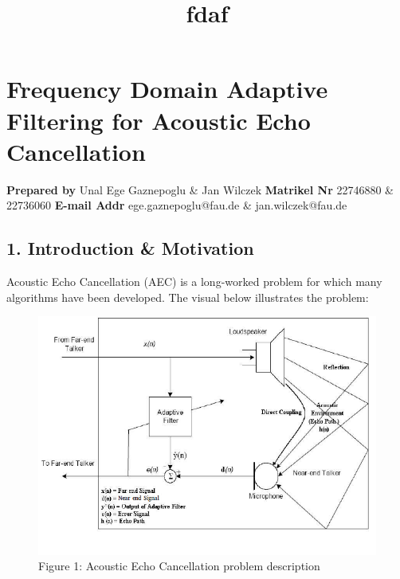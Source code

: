 \documentclass[11pt]{article}
\title{fdaf}
\begin{document}
    
    \maketitle
    
    

    
    \hypertarget{frequency-domain-adaptive-filtering-for-acoustic-echo-cancellation}{%
\section{Frequency Domain Adaptive Filtering for Acoustic Echo
Cancellation}\label{frequency-domain-adaptive-filtering-for-acoustic-echo-cancellation}}

\textbf{Prepared by} \textbar{} Unal Ege Gaznepoglu \& Jan Wilczek
\textbf{Matrikel Nr} \textbar{} 22746880 \& 22736060 \textbf{E-mail
Addr} \textbar{} ege.gaznepoglu@fau.de \& jan.wilczek@fau.de

    \hypertarget{introduction-motivation}{%
\subsection{1. Introduction \&
Motivation}\label{introduction-motivation}}

Acoustic Echo Cancellation (AEC) is a long-worked problem for which many
algorithms have been developed. The visual below illustrates the
problem:

\begin{figure}
\centering
\includegraphics{./Images/Fig1-AECdesc.png}
\caption{Figure 1: Acoustic Echo Cancellation problem description}
\end{figure}
\end{document}
